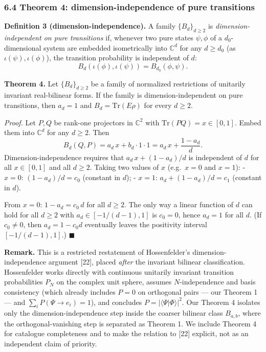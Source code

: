 \documentclass[
]{article}
\begin{document}
\subsubsection{6.4 Theorem 4: dimension-independence of pure
transitions}\label{theorem-4-dimension-independence-of-pure-transitions}

\textbf{Definition 3 (dimension-independence).} A family
\(\{B_d\}_{d\geq 2}\) is \emph{dimension-independent on pure
transitions} if, whenever two pure states \(\psi,\phi\) of a
\(d_0\)-dimensional system are embedded isometrically into
\(\mathbb C^d\) for any \(d\geq d_0\) (as \(\iota(\psi),\iota(\phi)\)),
the transition probability is independent of \(d\):
\[B_d(\iota(\phi),\iota(\psi))=B_{d_0}(\phi,\psi).\]

\textbf{Theorem 4.} Let \(\{B_d\}_{d\geq 2}\) be a family of normalized
restrictions of unitarily invariant real-bilinear forms. If the family
is dimension-independent on pure transitions, then \(a_d=1\) and
\(B_d=\mathrm{Tr}(E\rho)\) for every \(d\geq 2\).

\emph{Proof.} Let \(P,Q\) be rank-one projectors in \(\mathbb C^2\) with
\(\mathrm{Tr}(PQ)=x\in[0,1]\). Embed them into \(\mathbb C^d\) for any
\(d\geq 2\). Then
\[B_d(Q,P)=a_d\,x+b_d\cdot 1\cdot 1=a_d\,x+\frac{1-a_d}{d}.\]
Dimension-independence requires that \(a_d\,x+(1-a_d)/d\) is independent
of \(d\) for all \(x\in[0,1]\) and all \(d\geq 2\). Taking two values of
\(x\) (e.g.~\(x=0\) and \(x=1\)): - \(x=0\): \((1-a_d)/d = c_0\)
(constant in \(d\)); - \(x=1\): \(a_d+(1-a_d)/d = c_1\) (constant in
\(d\)).

From \(x=0\): \(1-a_d=c_0\,d\) for all \(d\geq 2\). The only way a
linear function of \(d\) can hold for all \(d\geq 2\) with
\(a_d\in[-1/(d-1),1]\) is \(c_0=0\), hence \(a_d=1\) for all \(d\). (If
\(c_0\neq 0\), then \(a_d=1-c_0 d\) eventually leaves the positivity
interval \([-1/(d-1),1]\).) \(\blacksquare\)

\textbf{Remark.} This is a restricted restatement of Hossenfelder's
dimension-independence argument {[}22{]}, placed \emph{after} the
invariant bilinear classification. Hossenfelder works directly with
continuous unitarily invariant transition probabilities \(P_N\) on the
complex unit sphere, assumes \(N\)-independence and basis consistency
(which already includes \(P=0\) on orthogonal pairs --- our Theorem 1
--- and \(\sum_i P(\Psi\to e_i)=1\)), and concludes
\(P=|\langle\Psi|\Phi\rangle|^2\). Our Theorem 4 isolates only the
dimension-independence step inside the coarser bilinear class
\(B_{a,b}\), where the orthogonal-vanishing step is separated as Theorem
1. We include Theorem 4 for catalogue completeness and to make the
relation to {[}22{]} explicit, not as an independent claim of priority.
\end{document}
